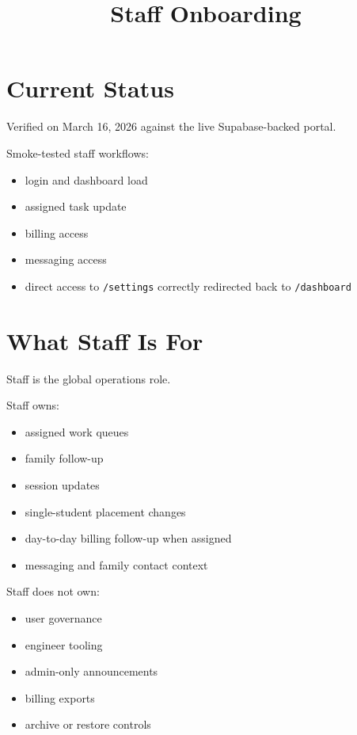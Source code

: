 \documentclass[11pt]{article}
\title{Staff Onboarding}
\author{}
\date{}
\begin{document}
\maketitle

\section*{Current Status}
Verified on March 16, 2026 against the live Supabase-backed portal.

Smoke-tested staff workflows:
\begin{itemize}
  \item login and dashboard load
  \item assigned task update
  \item billing access
  \item messaging access
  \item direct access to \texttt{/settings} correctly redirected back to \texttt{/dashboard}
\end{itemize}

\section*{What Staff Is For}
Staff is the global operations role.

Staff owns:
\begin{itemize}
  \item assigned work queues
  \item family follow-up
  \item session updates
  \item single-student placement changes
  \item day-to-day billing follow-up when assigned
  \item messaging and family contact context
\end{itemize}

Staff does not own:
\begin{itemize}
  \item user governance
  \item engineer tooling
  \item admin-only announcements
  \item billing exports
  \item archive or restore controls
\end{itemize}
\end{document}
